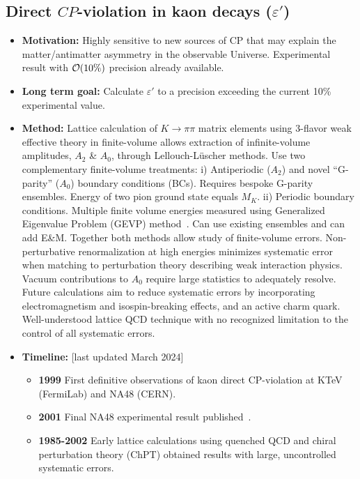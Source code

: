 \documentclass[12pt,hyperpdf]{article}
\begin{document}
\subsection{Direct $CP$-violation in kaon decays ($\varepsilon'$)}
\begin{itemize}
    \item{\bf Motivation:} Highly sensitive to new sources of CP that may explain the matter/antimatter asymmetry in the observable Universe. Experimental result with ${\cal O}(10\%)$ precision already available.
    \item{\bf Long term goal:} Calculate $\varepsilon'$ to a precision exceeding the current 10\% experimental value.        
    \item{\bf Method:} Lattice calculation of $K\to\pi\pi$ matrix elements using 3-flavor weak effective theory in finite-volume allows extraction of infinite-volume amplitudes, $A_2$ \& $A_0$, through Lellouch-L\"uscher methods.  Use two complementary finite-volume treatments: i) Antiperiodic ($A_2$) and novel ``G-parity'' ($A_0$) boundary conditions (BCs). Requires bespoke G-parity ensembles.  Energy of two pion ground state equals $M_K$. ii) Periodic boundary conditions.  Multiple finite volume energies measured using Generalized Eigenvalue Problem (GEVP) method~\cite{Luscher:1990ck,Bulava:2011yz}.  Can use existing ensembles and can add E\&M.  Together both methods allow study of finite-volume errors.  Non-perturbative renormalization at high energies minimizes systematic error when matching to perturbation theory describing weak interaction physics. Vacuum contributions to $A_0$ require large statistics to adequately resolve. Future calculations aim to reduce systematic errors by incorporating electromagnetism and isospin-breaking effects, and an active charm quark.  Well-understood lattice QCD technique with no recognized limitation to the control of all systematic errors. 
\item{\bf Timeline:} \hfill [last updated March 2024]
\begin{itemize}
    \item{\bf 1999} First definitive observations of kaon direct CP-violation at KTeV (FermiLab) and NA48 (CERN).
    \item{\bf 2001} Final NA48 experimental result published~\cite{NA48:2001bct}.
    \item{\bf 1985-2002} Early lattice calculations using quenched QCD and chiral perturbation theory (ChPT) obtained results with large, uncontrolled systematic errors.

\end{itemize}
\end{itemize}
\end{document}
